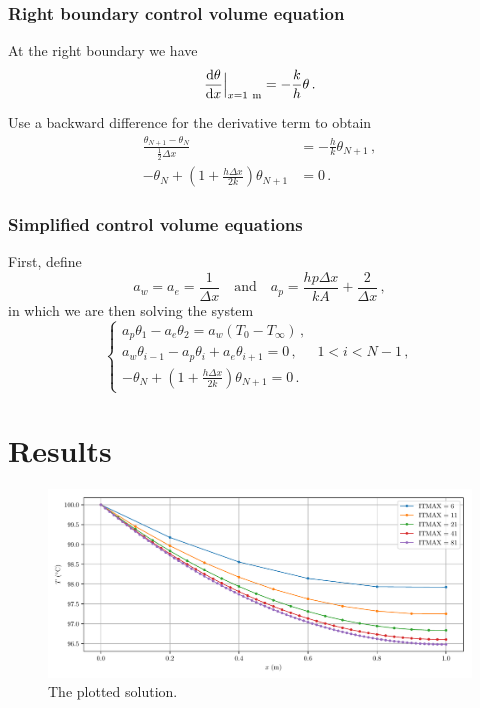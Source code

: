 \documentclass{article}
\begin{document}
\subsubsection*{Right boundary control volume equation}

At the right boundary we have
\[
	\dv{\theta}{x} \Big|_{x = 1~\text{m}} = - \frac{k}{h} \theta\,.
\]

Use a backward difference for the derivative term to obtain
\begin{align}
	\frac{\theta_{N+1} - \theta_N}{\frac{1}{2}\Delta x} & = - \frac{h}{k} \theta_{N+1}\,,\nonumber \\
	-\theta_N + \left(1 + \frac{h \Delta x}{2k}\right) \theta_{N+1} & = 0\,.
	\label{eq:int_rightcv}
\end{align}

\subsubsection*{Simplified control volume equations}

First, define
\[
	a_w = a_e = \frac{1}{\Delta x} \quad \text{and} \quad a_p = \frac{h p \Delta x}{kA} + \frac{2}{\Delta x}\,,
\]
in which we are then solving the system 
\begin{equation}
	\begin{cases}
		a_p \theta_1 - a_e \theta_2 = a_w (T_0 - T_\infty)\,, \\
		a_w \theta_{i - 1} - a_p \theta_i + a_e \theta_{i+1} = 0\,, & 1 < i < N - 1\,,\\
		-\theta_N + \left(1 + \frac{h \Delta x}{2k}\right) \theta_{N+1} = 0\,.
	\end{cases}
\end{equation}

\section*{Results}

\begin{figure}[H]
	\centering
	\includegraphics[width=\linewidth]{../python/result}
	\caption{The plotted solution.}
	\label{fig:results}
\end{figure}
\end{document}
